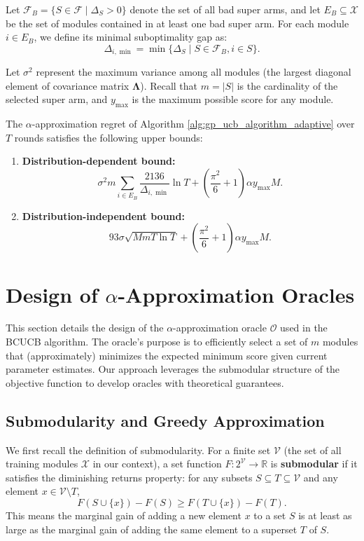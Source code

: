 \documentclass[opre,sglanonrev]{informs4}
\begin{document}
Let $\mathcal{F}_B = \{S \in \mathcal{F} \mid \Delta_S > 0\}$ denote the set of all bad super arms, and let $E_B \subseteq \mathcal{X}$ be the set of modules contained in at least one bad super arm. For each module $i \in E_B$, we define its minimal suboptimality gap as:
$$
\Delta_{i,\min} = \min\{\Delta_S \mid S \in \mathcal{F}_B, i \in S\}.
$$

Let $\sigma^2$ represent the maximum variance among all modules (the largest diagonal element of covariance matrix $\boldsymbol{\Lambda}$). Recall that $m = |S|$ is the cardinality of the selected super arm, and $y_{\text{max}}$ is the maximum possible score for any module.

\begin{theorem}
\label{thm:regret_bound}
The $\alpha$-approximation regret of Algorithm \ref{alg:gp_ucb_algorithm_adaptive} over $T$ rounds satisfies the following upper bounds:
\begin{enumerate}
    \item \textbf{Distribution-dependent bound:}
    $$
    \sigma^2 m \sum_{i \in E_B} \frac{2136}{\Delta_{i,\min}} \ln T + \left(\frac{\pi^2}{6} + 1\right) \alpha y_{\text{max}} M.
    $$
    
    \item \textbf{Distribution-independent bound:}
    $$
    93\sigma \sqrt{M m T \ln T} + \left(\frac{\pi^2}{6} + 1\right) \alpha y_{\text{max}} M.
    $$
\end{enumerate}
\end{theorem}

\section{Design of $\alpha$-Approximation Oracles}
\label{oracle}

This section details the design of the $\alpha$-approximation oracle $\mathcal{O}$ used in the BCUCB algorithm. The oracle's purpose is to efficiently select a set of $m$ modules that (approximately) minimizes the expected minimum score given current parameter estimates. Our approach leverages the submodular structure of the objective function to develop oracles with theoretical guarantees.

\subsection{Submodularity and Greedy Approximation}

We first recall the definition of submodularity. For a finite set $\mathcal{V}$ (the set of all training modules $\mathcal{X}$ in our context), a set function $F: 2^{\mathcal{V}} \to \mathbb{R}$ is \textbf{submodular} if it satisfies the diminishing returns property: for any subsets $S \subseteq T \subseteq \mathcal{V}$ and any element $x \in \mathcal{V} \setminus T$,
$$
F(S \cup \{x\}) - F(S) \geq F(T \cup \{x\}) - F(T).
$$
This means the marginal gain of adding a new element $x$ to a set $S$ is at least as large as the marginal gain of adding the same element to a superset $T$ of $S$.
\end{document}
